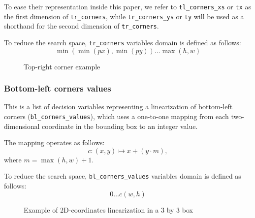 \documentclass[a4paper,10pt]{article}
\begin{document}
To ease their representation inside this paper, we refer to \texttt{tl\_corners\_xs} or \texttt{tx} as the first dimension of \texttt{tr\_corners}, while \texttt{tr\_corners\_ys} or \texttt{ty} will be used as a shorthand for the second dimension of \texttt{tr\_corners}.

To reduce the search space, \texttt{tr\_corners} variables domain is defined as follows: $$\min({\min({px}), \min({py})}) \dots \max({h, w})$$

\begin{figure}[H]
   \centering
   \caption{Top-right corner example}
\end{figure}

\subsubsection*{Bottom-left corners values} \label{sec:bottom-left-corners-values}
This is a list of decision variables representing a linearization of bottom-left corners (\texttt{bl\_corners\_values}), which uses a one-to-one mapping from each two-dimensional coordinate in the bounding box to an integer value.

The mapping operates as follows:
$$ c: (x,y) \mapsto x+(y\cdot m),$$ where $m = \max{(h,w)} + 1$.

To reduce the search space, \texttt{bl\_corners\_values} variables domain is defined as follows: $$0 \dots c(w, h)$$

\begin{figure}[H]
   \centering
   \caption{Example of 2D-coordinates linearization in a 3 by 3 box}
\end{figure}
\end{document}

